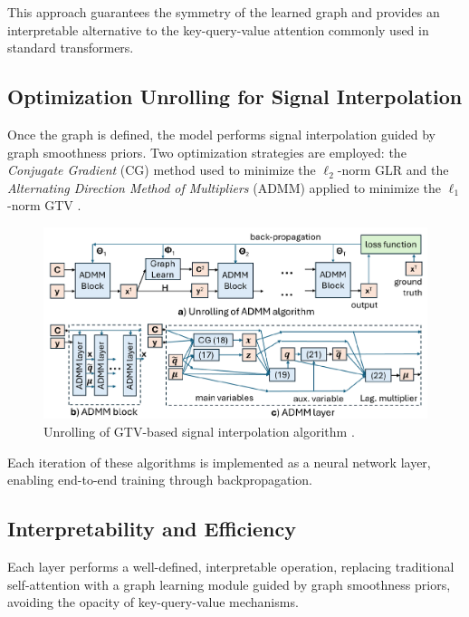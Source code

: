 \documentclass{article}
\theoremstyle{plain}
\theoremstyle{definition}
\theoremstyle{remark}
\begin{document}
This approach guarantees the symmetry of the learned graph and provides an interpretable alternative to the key-query-value attention commonly used in standard transformers.

\subsection{Optimization Unrolling for Signal Interpolation}

Once the graph is defined, the model performs signal interpolation guided by graph smoothness priors. Two optimization strategies are employed: the \textit{Conjugate Gradient} (CG) method used to minimize the $\ell_2$-norm GLR \cite{shewchuk1994introduction} and the \textit{Alternating Direction Method of Multipliers} (ADMM) applied to minimize the $\ell_1$-norm GTV \cite{wang2017new}.

\begin{figure}[ht]
\vskip -0.1in
\begin{center}
\centerline{\includegraphics[width=0.9\columnwidth]{GTV-based_algorithm.png}}
\caption{Unrolling of GTV-based signal interpolation algorithm \cite{do2024interpretable}.}
\label{fig:unrolling-gtv}
\end{center}
\vskip -0.3in
\end{figure}

Each iteration of these algorithms is implemented as a neural network layer, enabling end-to-end training through backpropagation.

\subsection{Interpretability and Efficiency}

Each layer performs a well-defined, interpretable operation, replacing traditional self-attention with a graph learning module guided by graph smoothness priors, avoiding the opacity of key-query-value mechanisms.
\end{document}
